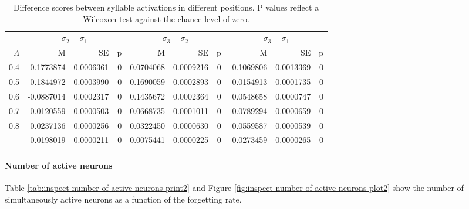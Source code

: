\documentclass[
]{article}
\begin{document}
\begin{table}

\caption{\label{tab:basic-experiment-global-print-act-in-words-table2}Difference scores between syllable activations in different positions. P values reflect a Wilcoxon test against the chance level of zero.}
\centering
\begin{tabular}[t]{rrrrrrrrrr}
\toprule
\multicolumn{1}{c}{ } & \multicolumn{3}{c}{$\sigma_2 - \sigma_1$} & \multicolumn{3}{c}{$\sigma_3 - \sigma_2$} & \multicolumn{3}{c}{$\sigma_3 - \sigma_1$} \\
\cmidrule(l{3pt}r{3pt}){2-4} \cmidrule(l{3pt}r{3pt}){5-7} \cmidrule(l{3pt}r{3pt}){8-10}
$\Lambda$ & M & SE & p & M & SE & p & M & SE & p\\
\midrule
0.4 & -0.1773874 & 0.0006361 & 0 & 0.0704068 & 0.0009216 & 0 & -0.1069806 & 0.0013369 & 0\\
0.5 & -0.1844972 & 0.0003990 & 0 & 0.1690059 & 0.0002893 & 0 & -0.0154913 & 0.0001735 & 0\\
0.6 & -0.0887014 & 0.0002317 & 0 & 0.1435672 & 0.0002364 & 0 & 0.0548658 & 0.0000747 & 0\\
0.7 & 0.0120559 & 0.0000503 & 0 & 0.0668735 & 0.0001011 & 0 & 0.0789294 & 0.0000659 & 0\\
0.8 & 0.0237136 & 0.0000256 & 0 & 0.0322450 & 0.0000630 & 0 & 0.0559587 & 0.0000539 & 0\\
\addlinespace
0.9 & 0.0198019 & 0.0000211 & 0 & 0.0075441 & 0.0000225 & 0 & 0.0273459 & 0.0000265 & 0\\
\bottomrule
\end{tabular}
\end{table}

\clearpage

\hypertarget{number-of-active-neurons}{%
\paragraph{Number of active neurons}\label{number-of-active-neurons}}

Table \ref{tab:inspect-number-of-active-neurons-print2} and Figure
\ref{fig:inspect-number-of-active-neurons-plot2} show the number of
simultaneously active neurons as a function of the forgetting rate.
\end{document}
